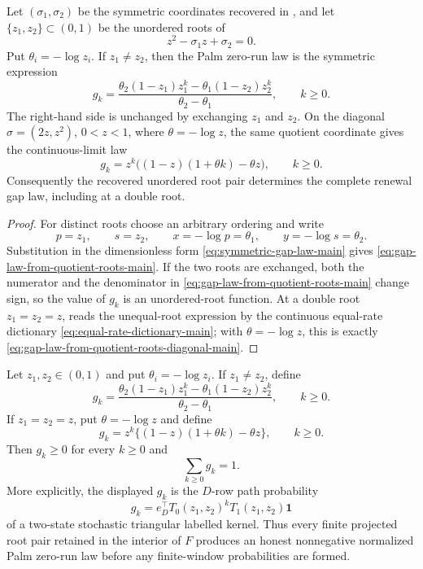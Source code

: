 \begin{lemma}\label{lem:gap-law-from-quotient-roots-main}
Let \((\sigma_1,\sigma_2)\) be the symmetric coordinates recovered in
, and let
\(\{z_1,z_2\}\subset(0,1)\) be the unordered roots of
\[
z^2-\sigma_1 z+\sigma_2=0 .
\]
Put \(\theta_i=-\log z_i\).  If \(z_1\ne z_2\), then the Palm zero-run law is
the symmetric expression
\begin{equation}\label{eq:gap-law-from-quotient-roots-main}
g_k=
\frac{\theta_2(1-z_1)z_1^k-\theta_1(1-z_2)z_2^k}
     {\theta_2-\theta_1},
\qquad k\ge0 .
\end{equation}
The right-hand side is unchanged by exchanging \(z_1\) and \(z_2\).  On the
diagonal \(\sigma=(2z,z^2)\), \(0<z<1\), where
\(\theta=-\log z\), the same quotient coordinate gives the continuous-limit
law
\begin{equation}\label{eq:gap-law-from-quotient-roots-diagonal-main}
g_k=z^k\bigl((1-z)(1+\theta k)-\theta z\bigr),
\qquad k\ge0 .
\end{equation}
Consequently the recovered unordered root pair determines the complete renewal
gap law, including at a double root.
\end{lemma}

\begin{proof}
For distinct roots choose an arbitrary ordering and write
\[
p=z_1,\qquad s=z_2,\qquad
x=-\log p=\theta_1,\qquad y=-\log s=\theta_2 .
\]
Substitution in the dimensionless form
\eqref{eq:symmetric-gap-law-main} gives
\eqref{eq:gap-law-from-quotient-roots-main}.  If the two roots are exchanged,
both the numerator and the denominator in
\eqref{eq:gap-law-from-quotient-roots-main} change sign, so the value of
\(g_k\) is an unordered-root function.  At a double root \(z_1=z_2=z\),
 reads the unequal-root expression by the continuous
equal-rate dictionary \eqref{eq:equal-rate-dictionary-main}; with
\(\theta=-\log z\), this is exactly
\eqref{eq:gap-law-from-quotient-roots-diagonal-main}.
\end{proof}

\begin{lemma}\label{lem:projected-root-gap-law-valid-main}
Let \(z_1,z_2\in(0,1)\) and put \(\theta_i=-\log z_i\).  If
\(z_1\ne z_2\), define
\[
g_k=
\frac{\theta_2(1-z_1)z_1^k-\theta_1(1-z_2)z_2^k}
     {\theta_2-\theta_1},
\qquad k\ge0 .
\]
If \(z_1=z_2=z\), put \(\theta=-\log z\) and define
\[
g_k=z^k\{(1-z)(1+\theta k)-\theta z\},
\qquad k\ge0 .
\]
Then \(g_k\ge0\) for every \(k\ge0\) and
\[
\sum_{k\ge0}g_k=1 .
\]
More explicitly, the displayed \(g_k\) is the \(D\)-row path probability
\[
g_k=e_D^\top T_0(z_1,z_2)^kT_1(z_1,z_2)\mathbf1
\]
of a two-state stochastic triangular labelled kernel.  Thus every finite
projected root pair retained in the interior of \(F\) produces an honest
nonnegative normalized Palm zero-run law before any finite-window
probabilities are formed.
\end{lemma}

